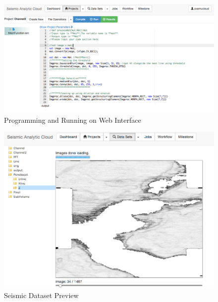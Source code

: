 \begin{figure}[H]
\centering
\includegraphics[scale=.35]{figures/Programming.png}
\caption{Programming and Running on Web Interface}
\label{Programming}
\end{figure}


\begin{figure}[H]
\centering
\includegraphics[scale=.45]{figures/DataSet.png}
\caption{Seismic Dataset Preview}
\label{DataSet}
\end{figure}

